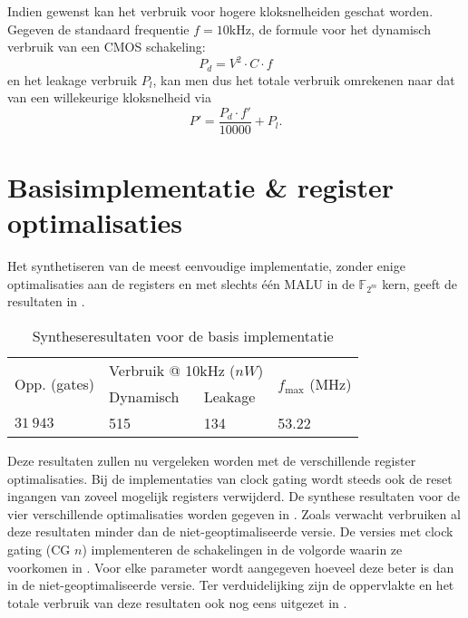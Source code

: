 
Indien gewenst kan het verbruik voor hogere kloksnelheiden geschat worden. Gegeven de standaard frequentie $f = 10$kHz, de formule voor het dynamisch verbruik van een CMOS schakeling:
\[P_d = V^2 \cdot C \cdot f\]
en het leakage verbruik $P_l$, kan men dus het totale verbruik omrekenen naar dat van een willekeurige kloksnelheid via
\[P' = \frac{P_d \cdot f'}{10 000} + P_l.\]

\section{Basisimplementatie \& register optimalisaties\label{section-resultaten-basisimplementatie}}

Het synthetiseren van de meest eenvoudige implementatie, zonder enige optimalisaties aan de registers en met slechts \'e\'en MALU in de $\mathbb{F}_{2^m}$ kern, geeft de resultaten in .

\begin{table}[h]
	\caption{Syntheseresultaten voor de basis implementatie}
	\label{tabel-resultaten-basis}

	\centering
	\begin{tabular}{|l|l|l|l|}
		\hline
		\multirow{2}{*}{Opp. (gates)}	& \multicolumn{2}{c|}{Verbruik @ 10kHz ($nW$)}	& \multirow{2}{*}{$f_{\text{max}}$ (MHz)}\\
		\cline{2-3}
		& Dynamisch	& Leakage	& \\
		\hline
		$31\:943$	& 515	& 134	& 53.22\\
		\hline		
	\end{tabular}
\end{table}

Deze resultaten zullen nu vergeleken worden met de verschillende register optimalisaties. Bij de implementaties van clock gating wordt steeds ook de reset ingangen van zoveel mogelijk registers verwijderd. De synthese resultaten voor de vier verschillende optimalisaties worden gegeven in . Zoals verwacht verbruiken al deze resultaten minder dan de niet-geoptimaliseerde versie. De versies met clock gating (CG $n$) implementeren de schakelingen in de volgorde waarin ze voorkomen in . Voor elke parameter wordt aangegeven hoeveel deze beter is dan in de niet-geoptimaliseerde versie. Ter verduidelijking zijn de oppervlakte en het totale verbruik van deze resultaten ook nog eens uitgezet in .

